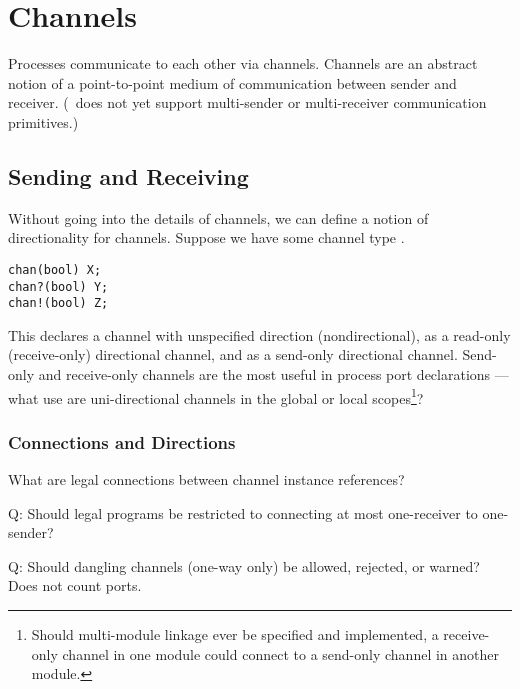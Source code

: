 

\chapter{Channels}
\label{sec:channels}

Processes communicate to each other via channels.  
Channels are an abstract notion of a point-to-point medium
of communication between sender and receiver.
(\hac\ does not yet support multi-sender or multi-receiver communication
primitives.)  

\section{Sending and Receiving}
\label{sec:channel:sendrecv}

Without going into the details of channels, we can define a notion of 
directionality for channels.  
Suppose we have some channel type .  

\begin{verbatim}
chan(bool) X;
chan?(bool) Y;
chan!(bool) Z;
\end{verbatim}

This declares a channel  with unspecified direction (nondirectional), 
 as a read-only (receive-only) directional channel, 
and  as a send-only directional channel.  
Send-only and receive-only channels are the most useful in
process port declarations ---
what use are uni-directional channels in the global or local 
scopes\footnote{Should multi-module linkage ever be specified and implemented, 
a receive-only channel in one module could connect to 
a send-only channel in another module.}?

\subsection{Connections and Directions}
\label{sec:channel:sendrecv:connect}

What are legal connections between channel instance references?

Q: Should legal programs be restricted to connecting
at most one-receiver to one-sender?

Q: Should dangling channels (one-way only) be allowed, rejected, or warned?
Does not count ports.  

